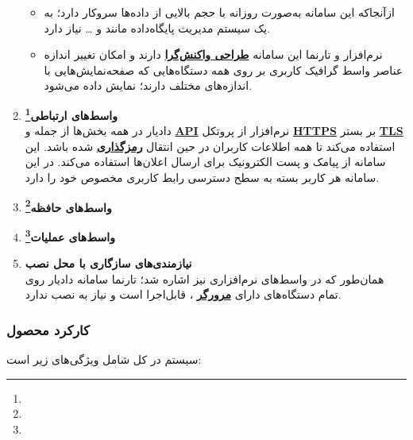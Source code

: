 \documentclass[12pt,a4paper,oneside]{article}
\begin{document}
\begin{enumerate}
\begin{itemize}
			\item
			 ازآنجاکه این سامانه به‌صورت روزانه
			با حجم بالایی از داده‌ها سروکار دارد؛ به یک سیستم 
			مدیریت پایگاه‌داده مانند
			و … نیاز دارد.
			
			\item
			   نرم‌افزار و تارنما این سامانه 
			\hyperref[ref:responsivedesign]{\textbf{طراحی واکنش‌گرا}}
			دارند و امکان تغییر اندازه عناصر واسط گرافیک کاربری بر روی همه دستگاه‌هایی که صفحه‌نمایش‌هایی با اندازه‌های مختلف دارند؛ نمایش داده می‌شود.
		\end{itemize}

		\item 
		\textbf{واسط‌های ارتباطی\footnote{}}
		\\
		دادیار در همه بخش‌ها از جمله 
		 و
		  \hyperref[ref:api]{\textbf{API}}
		  نرم‌افزار از پروتکل 
		  \hyperref[ref:https]{\textbf{HTTPS}}
		   بر بستر 
		   \hyperref[ref:tls]{\textbf{TLS}}
			استفاده می‌کند تا همه اطلاعات کاربران در حین انتقال 
			\hyperref[ref:encryption]{\textbf{رمزگذاری}}
			 شده باشد. این سامانه از پیامک و پست الکترونیک برای ارسال اعلان‌ها استفاده می‌کند. در این سامانه هر کاربر بسته به سطح دسترسی رابط کاربری مخصوص خود را دارد.

		\item 
		\textbf{واسط‌های حافظه\footnote{}}

		\item 
		\textbf{واسط‌های عملیات\footnote{}}

		\item 
		\textbf{نیازمندی‌های سازگاری با محل نصب}
		\\
		همان‌طور که در واسط‌های نرم‌افزاری نیز اشاره شد؛ تارنما سامانه دادیار روی تمام دستگاه‌های دارای 
		\hyperref[ref:browser]{\textbf{مرورگر}}
		، قابل‌اجرا است و نیاز به نصب ندارد.

	\end{enumerate}

	\subsubsection{کارکرد محصول}

	سیستم در کل شامل ویژگی‌های زیر است:
	
\end{document}
